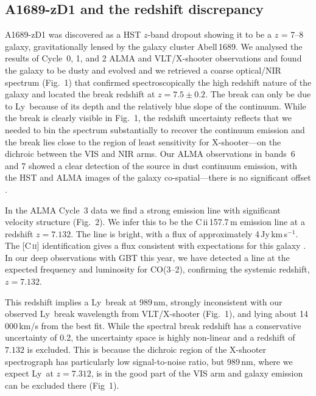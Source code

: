 \documentclass[letter,12pt]{article}
\newcommand{\lya}{Ly\textalpha}
\newcommand{\cii}{C\,{\sc ii}}
\begin{document}
\subsection{A1689-zD1 and the redshift discrepancy}

A1689-zD1 was discovered as a HST \(z\)-band dropout \citep{} showing it to be a
\(z\) = 7--8 galaxy, gravitationally lensed by the galaxy cluster Abell\,1689.
We analysed the results of Cycle~0, 1, and 2 ALMA and VLT/X-shooter observations
\citep{watson15,2017MNRAS.466..138K} and found the galaxy to be dusty and
evolved and we retrieved a coarse optical/NIR spectrum (Fig.~1) that confirmed
spectroscopically the high redshift nature of the galaxy and located the break
redshift at \(z=7.5\pm0.2\). The break can only be due to \lya\ because of its
depth and the relatively blue slope of the continuum. While the break is clearly
visible in Fig.~1, the redshift uncertainty reflects that we needed to bin the
spectrum substantially to recover the continuum emission and the break lies
close to the region of least sensitivity for X-shooter---on the dichroic
between the VIS and NIR arms. Our ALMA observations in bands~6 and 7 showed a
clear detection of the source in dust continuum emission, with the HST and ALMA
images of the galaxy co-spatial---there is no significant offset
\citep{watson15,2017MNRAS.466..138K}.

In the ALMA Cycle~3 data we find a strong emission line with significant
velocity structure (Fig.~2). We infer this to be the \cii\,157.7\,{\textmu}m
emission line at a redshift \(z=7.132\). The line is bright, with a flux of
approximately 4\,Jy\,km\,s\(^{-1}\). The [C\,\textsc{ii}] identification gives a
flux consistent with expectations for this galaxy \citep{2011MNRAS.416.2712D}.
In our deep observations with GBT this year, we have detected a line at the
expected frequency and luminosity \citep{2010ApJ...724..957S} for CO(3--2),
confirming the systemic redshift, \(z=7.132\).

This redshift implies a \lya\ break at 989\,nm, strongly inconsistent
with our observed \lya\ break wavelength from VLT/X-shooter (Fig.~1), and lying
about 14\,000\,km/s from the best fit. While the spectral break redshift has a
conservative uncertainty of 0.2, the uncertainty space is highly non-linear and
a redshift of \(7.132\) is excluded. This is because the dichroic
region of the X-shooter spectrograph has particularly low signal-to-noise ratio,
but 989\,nm, where we expect \lya\ at \(z=7.312\), is in the good part of the
VIS arm and galaxy emission can be excluded there (Fig~1).
\end{document}
